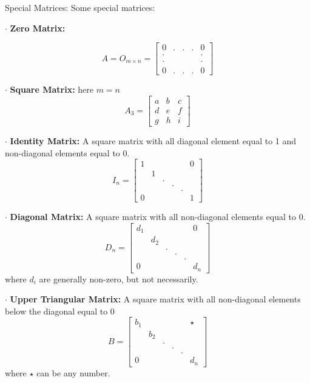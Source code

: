 \documentclass{article}
\begin{document}
\begin{paragraph}{Special Matrices:} Some special matrices:

    $\cdot$ \textbf{Zero Matrix:} 
    
    $$ A = O_{m \times n} = \begin{bmatrix}
        0 & . & . & . & 0 \\
        \cdot &&&& \cdot \\
        \cdot &&&& \cdot \\
        0 & . & . & . & 0
    \end{bmatrix}$$
    
    $\cdot$ \textbf{Square Matrix:} here $m = n$
        $$A_3 = \begin{bmatrix}
            a & b & c \\
            d & e & f \\
            g & h & i
        \end{bmatrix}$$

    $\cdot$ \textbf{Identity Matrix:} A square matrix with all diagonal element equal to 1 and non-diagonal elements equal to 0.
        $$ I_n = \begin{bmatrix}
            1 &&&&& 0 \\
            &1&&&&\\
            &&.&&&\\
            &&&.&&\\
            &&&&.&\\
            0&&&&&1
        \end{bmatrix}$$

    $\cdot$ \textbf{Diagonal Matrix:} A square matrix with all non-diagonal elements equal to 0.
        $$ D_n = \begin{bmatrix}
            d_1 &&&&& 0 \\
            &d_2&&&&\\
            &&.&&&\\
            &&&.&&\\
            &&&&.&\\
            0&&&&&d_n
        \end{bmatrix}$$
        where $d_i$ are generally non-zero, but not necessarily.
        
    $\cdot$ \textbf{Upper Triangular Matrix:} A square matrix with all non-diagonal elements below the diagonal equal to 0
        $$ B = \begin{bmatrix}
            b_1 &&&&& \star \\
            &b_2&&&&\\
            &&.&&&\\
            &&&.&&\\
            &&&&.&\\
            0&&&&&d_n
        \end{bmatrix}$$
        where $\star$ can be any number.


\end{paragraph}
\end{document}
